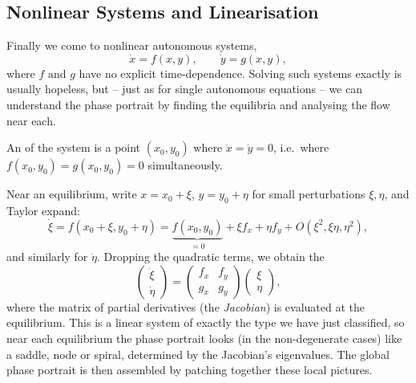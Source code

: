 \subsection{Nonlinear Systems and Linearisation}

Finally we come to nonlinear autonomous systems,
$$
\dot x = f(x, y), \qquad \dot y = g(x, y),
$$
where $f$ and $g$ have no explicit time-dependence. Solving such systems exactly is usually hopeless, but -- just as for single autonomous equations -- we can understand the phase portrait by finding the equilibria and analysing the flow near each.

\begin{definition}
	An  of the system is a point $(x_0, y_0)$ where $\dot x = \dot y = 0$, i.e.\ where $f(x_0, y_0) = g(x_0, y_0) = 0$ simultaneously.
\end{definition}

Near an equilibrium, write $x = x_0 + \xi$, $y = y_0 + \eta$ for small perturbations $\xi, \eta$, and Taylor expand:
$$
\dot \xi = f(x_0 + \xi, y_0 + \eta) = \underbrace{f(x_0, y_0)}_{=0} + \xi f_x + \eta f_y + O(\xi^2, \xi\eta, \eta^2),
$$
and similarly for $\dot\eta$. Dropping the quadratic terms, we obtain the 
$$
\begin{pmatrix} \dot \xi \\ \dot \eta \end{pmatrix} = \begin{pmatrix} f_x & f_y \\ g_x & g_y \end{pmatrix}\begin{pmatrix} \xi \\ \eta \end{pmatrix},
$$
where the matrix of partial derivatives (the \emph{Jacobian}) is evaluated at the equilibrium. This is a linear system of exactly the type we have just classified, so near each equilibrium the phase portrait looks (in the non-degenerate cases) like a saddle, node or spiral, determined by the Jacobian's eigenvalues. The global phase portrait is then assembled by patching together these local pictures.

